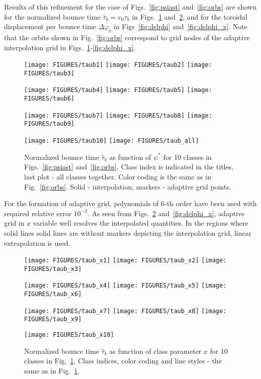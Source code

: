 \documentclass[preprint,prb,aps]{revtex4-1}
\begin{document}
Results of this refinement for the case of Figs.~\ref{fig:psiast} 
and~\ref{fig:orbs} are shown for the normalized bounce time
$\hat \tau_b = v_0 \tau_b$ in Figs.~\ref{fig:taub} and~\ref{fig:taub_x},
and for the toroidal displacement per bounce time $\Delta\varphi_b$ 
in Figs~\ref{fig:delphi} and~\ref{fig:delphi_x}. Note that the orbits shown
in Fig.~\ref{fig:orbs} correspond to grid nodes of the adaptive interpolation
grid in Figs.~\ref{fig:taub}-\ref{fig:delphi_x}. 
%
\begin{figure}[ht]
\centerline{
\texttt{[image: FIGURES/taub1]}
\texttt{[image: FIGURES/taub2]}
\texttt{[image: FIGURES/taub3]}
}
\centerline{
\texttt{[image: FIGURES/taub4]}
\texttt{[image: FIGURES/taub5]}
\texttt{[image: FIGURES/taub6]}
}
\centerline{
\texttt{[image: FIGURES/taub7]}
\texttt{[image: FIGURES/taub8]}
\texttt{[image: FIGURES/taub9]}
}
\centerline{
\texttt{[image: FIGURES/taub10]}
\texttt{[image: FIGURES/taub\_all]}
}
\caption[]{
Normalized bounce time $\hat\tau_b$ as function of $\psi^\ast$ for 10 classes 
in Figs.~\ref{fig:psiast} and~\ref{fig:orbs}. Class index is indicated
in the titles,  last plot - all classes together.
Color coding is the same as in Fig.~\ref{fig:orbs}. Solid - 
interpolation, markers - adaptive grid points.
}
\label{fig:taub}
\end{figure}
%
For the formation of adaptive grid, polynomials of 6-th order have been
used with required relative error $10^{-3}$.
As seen from Figs.~\ref{fig:taub_x} and~\ref{fig:delphi_x}, adaptive grid
in $x$ variable well resolves the interpolated quantities. 
In the regions where solid lines solid lines are without markers depicting
the interpolation grid, linear extrapolation is used.
%
\begin{figure}[ht]
\centerline{
\texttt{[image: FIGURES/taub\_x1]}
\texttt{[image: FIGURES/taub\_x2]}
\texttt{[image: FIGURES/taub\_x3]}
}
\centerline{
\texttt{[image: FIGURES/taub\_x4]}
\texttt{[image: FIGURES/taub\_x5]}
\texttt{[image: FIGURES/taub\_x6]}
}
\centerline{
\texttt{[image: FIGURES/taub\_x7]}
\texttt{[image: FIGURES/taub\_x8]}
\texttt{[image: FIGURES/taub\_x9]}
}
\centerline{
\texttt{[image: FIGURES/taub\_x10]}
}
\caption[]{
Normalized bounce time $\hat\tau_b$ as function of class parameter $x$ 
for 10 classes in Fig.~\ref{fig:taub}. Class indices, color coding and
line styles - the same as in Fig.~\ref{fig:taub}.
}
\label{fig:taub_x}
\end{figure}
%
\end{document}
